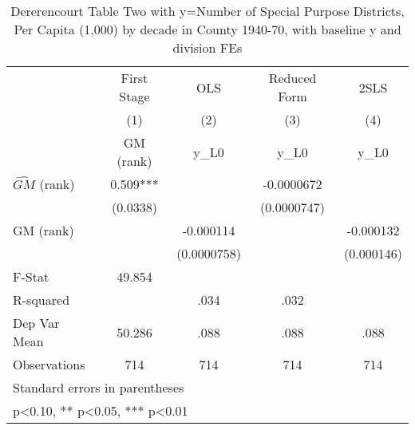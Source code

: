 \begin{table}[htbp]\centering
\def\sym#1{\ifmmode^{#1}\else\(^{#1}\)\fi}
\caption{Dererencourt Table Two with y=Number of Special Purpose Districts, Per Capita (1,000) by decade in County 1940-70, with baseline y and division FEs}
\begin{tabular}{l*{4}{c}}
\toprule
                    & First Stage   &         OLS   &Reduced Form   &        2SLS   \\
                    &\multicolumn{1}{c}{(1)}&\multicolumn{1}{c}{(2)}&\multicolumn{1}{c}{(3)}&\multicolumn{1}{c}{(4)}\\
                    &\multicolumn{1}{c}{GM  (rank)}&\multicolumn{1}{c}{y\_L0}&\multicolumn{1}{c}{y\_L0}&\multicolumn{1}{c}{y\_L0}\\
\midrule
$\hat{GM}$ (rank)   &       0.509***&               &  -0.0000672   &               \\
                    &    (0.0338)   &               & (0.0000747)   &               \\
\addlinespace
GM  (rank)          &               &   -0.000114   &               &   -0.000132   \\
                    &               & (0.0000758)   &               &  (0.000146)   \\
\midrule
F-Stat              &      49.854   &               &               &               \\
R-squared           &               &        .034   &        .032   &               \\
Dep Var Mean        &      50.286   &        .088   &        .088   &        .088   \\
Observations        &         714   &         714   &         714   &         714   \\
\bottomrule
\multicolumn{5}{l}{\footnotesize Standard errors in parentheses}\\
\multicolumn{5}{l}{\footnotesize * p<0.10, ** p<0.05, *** p<0.01}\\
\end{tabular}
\end{table}
